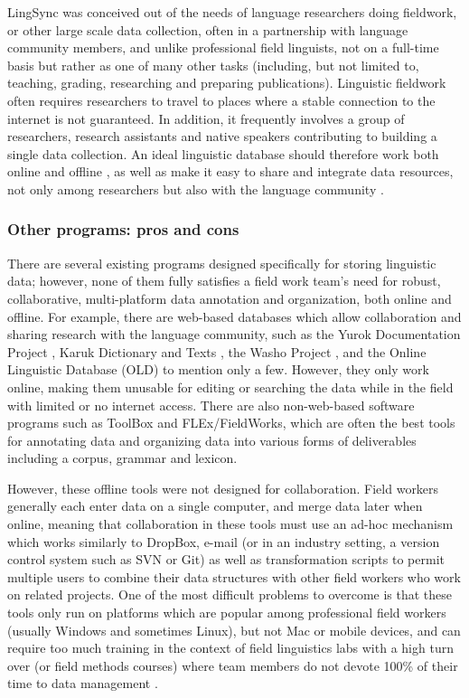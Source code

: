 \documentclass[letterpaper, 12pt, dvips]{mitwpl}
\begin{document}
LingSync was conceived out of the needs of language researchers doing
fieldwork, or other large scale data collection, 
often in a partnership with language community members, 
and unlike professional field linguists, 
 not on a full-time basis but rather as one of many other tasks (including, but not limited to, teaching, grading, researching and preparing publications).
Linguistic fieldwork often requires researchers
to travel to places where a stable connection to the internet is not guaranteed.
In addition,
it frequently involves a group of researchers, research assistants and native speakers contributing to building a single data collection.
An ideal linguistic database should therefore work both online and offline \citep[p.1556]{Wittenburg:2006}, as well as
make it easy to share and integrate data resources,
not only among researchers but also with the language community \citep{Good:2012, Thieberger:2012}.


\subsubsection{Other programs: pros and cons}


There are several existing programs designed specifically for storing linguistic data; however,
none of them fully satisfies a field work team's need for robust,
collaborative,
multi-platform data annotation and organization,
both online and offline.
For example,
there are web-based databases which allow collaboration and sharing research with the language community,
such as 
the Yurok Documentation Project \citep{Yurok:2001:Online},
 Karuk Dictionary and Texts \citep{Karuk:2009:Online},
the Washo Project \citep{Washo:2005:Online, WashoMobile:2008:Online, Cihlar:2008}, 
and the Online Linguistic Database (OLD) \citep{OLD:2010:Online} to mention only a few. 
However, they only work online,
making them unusable for editing or searching the data while in the field with limited or no internet access.
There are also non-web-based software programs such as ToolBox \citep{ToolBox:2003:Online} 
and FLEx/FieldWorks,
\citep{FLEx:2011:Online}
which are often the best tools for annotating
data and organizing data into various forms of deliverables  
including a corpus,
grammar and lexicon.

However, these offline tools were not designed for collaboration. 
Field workers generally each enter data on a single computer,
and merge data later when online,
 meaning that collaboration in these tools must use an ad-hoc mechanism which works similarly to DropBox, e-mail (or in an industry setting, a version control system such as SVN or Git)
as well as transformation scripts to permit multiple users to combine their data structures with other field workers who work on related projects.
One of the most difficult problems to overcome is that 
these tools only run on platforms which are popular among professional field workers  (usually Windows and sometimes Linux), but 
not Mac or mobile devices, and can require too much training in the context of field linguistics labs with a high turn over (or field methods courses) where team members do not devote 100\% of their time to data management \citep{Butler:2007}.
\end{document}
